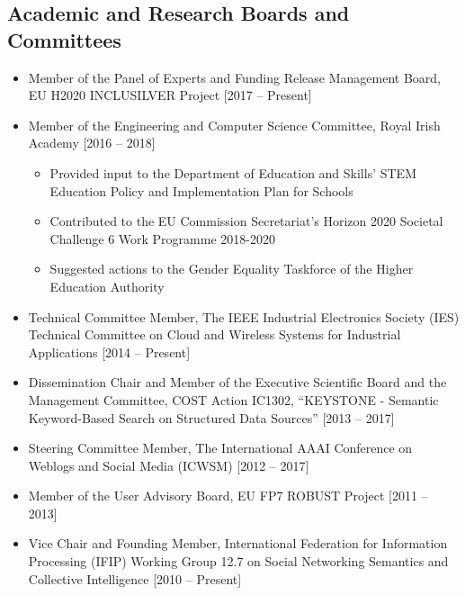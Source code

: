 \documentclass[10pt,a4paper]{res} %
\begin{document}
\begin{resume}
\subsection*{Academic and Research Boards and Committees}
\begin{itemize} \itemsep -2pt
\item Member of the Panel of Experts and Funding Release Management Board, EU H2020 INCLUSILVER Project [2017 -- Present]
\item Member of the Engineering and Computer Science Committee, Royal Irish Academy [2016 -- 2018]
\begin{itemize} \itemsep -2pt
\item Provided input to the Department of Education and Skills' STEM Education Policy and Implementation Plan for Schools
\item Contributed to the EU Commission Secretariat's Horizon 2020 Societal Challenge 6 Work Programme 2018-2020
\item Suggested actions to the Gender Equality Taskforce of the Higher Education Authority
\end{itemize}
\item Technical Committee Member, The IEEE Industrial Electronics Society (IES) Technical Committee on Cloud and Wireless Systems for Industrial Applications [2014 -- Present]
\item Dissemination Chair and Member of the Executive Scientific Board and the Management Committee, COST Action IC1302, ``KEYSTONE - Semantic Keyword-Based Search on Structured Data Sources'' [2013 -- 2017]
\item Steering Committee Member, The International AAAI Conference on Weblogs and Social Media (ICWSM) [2012 -- 2017]
\item Member of the User Advisory Board, EU FP7 ROBUST Project [2011 -- 2013]
\item Vice Chair and Founding Member, International Federation for Information Processing (IFIP) Working Group 12.7 on Social Networking Semantics and Collective Intelligence [2010 -- Present]
\end{itemize}


\end{resume}
\end{document}
